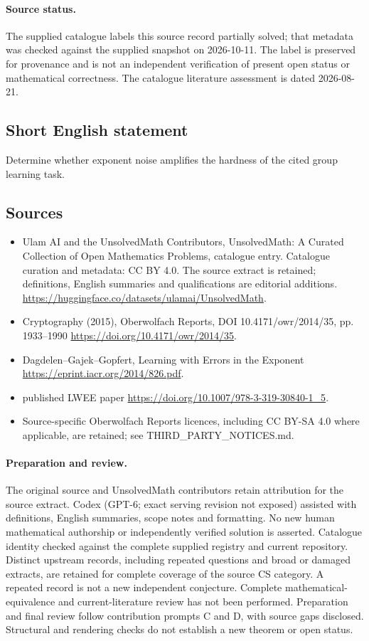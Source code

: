 \documentclass[11pt]{article}
\begin{document}
\paragraph{Source status.}
The supplied catalogue labels this source record partially solved; that metadata was checked against the supplied snapshot on 2026-10-11. The label is preserved for provenance and is not an independent verification of present open status or mathematical correctness. The catalogue literature assessment is dated 2026-08-21.
\subsection{Short English statement}
Determine whether exponent noise amplifies the hardness of the cited group learning task.
\subsection{Sources}
\begin{itemize}
\item[S1] Ulam AI and the UnsolvedMath Contributors, UnsolvedMath: A Curated Collection of Open Mathematics Problems, catalogue entry. Catalogue curation and metadata: CC BY 4.0. The source extract is retained; definitions, English summaries and qualifications are editorial additions.
\url{https://huggingface.co/datasets/ulamai/UnsolvedMath}.
\item[S2] Cryptography (2015), Oberwolfach Reports, DOI 10.4171/owr/2014/35, pp. 1933--1990
\url{https://doi.org/10.4171/owr/2014/35}.
\item[S3] Dagdelen--Gajek--Gopfert, Learning with Errors in the Exponent
\url{https://eprint.iacr.org/2014/826.pdf}.
\item[S4] published LWEE paper
\url{https://doi.org/10.1007/978-3-319-30840-1_5}.
\item Source-specific Oberwolfach Reports licences, including CC BY-SA 4.0 where applicable, are retained; see THIRD\_PARTY\_NOTICES.md.
\end{itemize}
\paragraph{Preparation and review.}
The original source and UnsolvedMath contributors retain attribution for the source extract. Codex (GPT-6; exact serving revision not exposed) assisted with definitions, English summaries, scope notes and formatting. No new human mathematical authorship or independently verified solution is asserted. Catalogue identity checked against the complete supplied registry and current repository. Distinct upstream records, including repeated questions and broad or damaged extracts, are retained for complete coverage of the source CS category. A repeated record is not a new independent conjecture. Complete mathematical-equivalence and current-literature review has not been performed. Preparation and final review follow contribution prompts C and D, with source gaps disclosed. Structural and rendering checks do not establish a new theorem or open status.
\label{end:statement}
\end{document}
